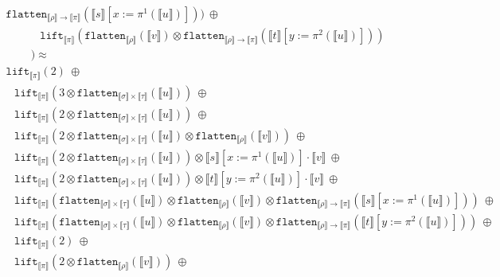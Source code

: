 \documentclass[runningheads,a4paper]{llncs}
\newcommand{\typeinterpret}[1]{\llbracket #1 \rrbracket}
\newcommand{\interpret}[1]{\llbracket #1 \rrbracket}
\newcommand{\arrtype}{\rightarrow}
\newcommand{\flatten}{\mathtt{flatten}}
\newcommand{\lift}{\mathtt{lift}}
\begin{document}
\begin{itemize}
\[\begin{array}{l}
    \flatten_{\typeinterpret{\rho} \arrtype \typeinterpret{\pi}}(
    \interpret{s}[x:=\pi^1(\interpret{u})]))\ \oplus \\
  \phantom{ABCD}
  \lift_{\typeinterpret{\pi}}(
    \flatten_{\typeinterpret{\rho}}(\interpret{v}) \otimes
    \flatten_{\typeinterpret{\rho} \arrtype
    \typeinterpret{\pi}}(\interpret{t}[y:=\pi^2(\interpret{u})])) \\
  \phantom{ABC}) \approx \\
  \lift_{\typeinterpret{\pi}}(2)\ \oplus \\
  \phantom{A}
  \lift_{\typeinterpret{\pi}}(3 \otimes \flatten_{\typeinterpret{\sigma}
    \times \typeinterpret{\tau}}(\interpret{u}))\ \oplus \\
  \phantom{A}\lift_{\typeinterpret{\pi}}(2 \otimes
    \flatten_{\typeinterpret{\sigma} \times
    \typeinterpret{\tau}}(\interpret{u}))\ \oplus \\
  \phantom{A}
  \lift_{\typeinterpret{\pi}}(2 \otimes
    \flatten_{\typeinterpret{\sigma} \times
    \typeinterpret{\tau}}(\interpret{u}) \otimes
    \flatten_{\typeinterpret{\rho}}(\interpret{v}))\ \oplus \\
  \phantom{A}
  \lift_{\typeinterpret{\pi}}(2 \otimes
    \flatten_{\typeinterpret{\sigma} \times
    \typeinterpret{\tau}}(\interpret{u})) \otimes
    \interpret{s}[x:=\pi^1(\interpret{u})] \cdot \interpret{v}\ \oplus\\
  \phantom{A}
  \lift_{\typeinterpret{\pi}}(2 \otimes
    \flatten_{\typeinterpret{\sigma} \times
    \typeinterpret{\tau}}(\interpret{u})) \otimes
    \interpret{t}[y:=\pi^2(\interpret{u})] \cdot \interpret{v}\ \oplus \\
  \phantom{A}
  \lift_{\typeinterpret{\pi}}(\flatten_{\typeinterpret{\sigma} \times
    \typeinterpret{\tau}}(\interpret{u}) \otimes
    \flatten_{\typeinterpret{\rho}}(\interpret{v}) \otimes
    \flatten_{\typeinterpret{\rho} \arrtype \typeinterpret{\pi}}(
    \interpret{s}[x:=\pi^1(\interpret{u})]))\ \oplus \\
  \phantom{A}
  \lift_{\typeinterpret{\pi}}(\flatten_{\typeinterpret{\sigma} \times
    \typeinterpret{\tau}}(\interpret{u}) \otimes
    \flatten_{\typeinterpret{\rho}}(\interpret{v}) \otimes
    \flatten_{\typeinterpret{\rho} \arrtype \typeinterpret{\pi}}(
    \interpret{t}[y:=\pi^2(\interpret{u})]))\ \oplus \\
  \phantom{A}
  \lift_{\typeinterpret{\pi}}(2)\ \oplus \\
  \phantom{A}
  \lift_{\typeinterpret{\pi}}(2 \otimes \flatten_{
    \typeinterpret{\rho}}(\interpret{v}))\ \oplus \\

\end{array}\]
\end{itemize}
\end{document}
